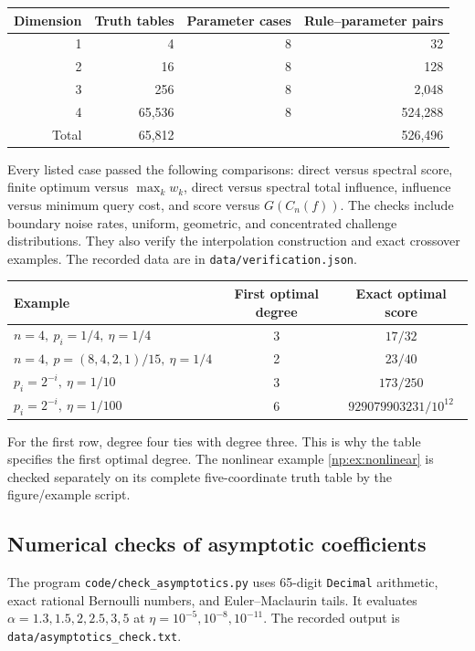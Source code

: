 \documentclass[11pt,a4paper]{article}
\theoremstyle{definition}
\theoremstyle{remark}
\begin{document}
\begin{center}
\begin{tabular}{@{}rrrr@{}}
\toprule
Dimension&Truth tables&Parameter cases&Rule--parameter pairs\\
\midrule
1&4&8&32\\
2&16&8&128\\
3&256&8&2,048\\
4&65,536&8&524,288\\
\midrule
Total&65,812&&526,496\\
\bottomrule
\end{tabular}
\end{center}

Every listed case passed the following comparisons: direct versus spectral
score, finite optimum versus \(\max_k w_k\), direct versus spectral total
influence, influence versus minimum query cost, and score versus
\(G(C_n(f))\). The checks include boundary noise rates, uniform,
geometric, and concentrated challenge distributions. They also verify
the interpolation construction and exact crossover examples.
The recorded data are in \texttt{data/verification.json}.

\begin{center}
\small
\begin{tabular}{@{}L{.39\textwidth}cc@{}}
\toprule
Example & First optimal degree & Exact optimal score\\
\midrule
\(n=4,\ p_i=1/4,\ \eta=1/4\)&3&\(17/32\)\\
\(n=4,\ p=(8,4,2,1)/15,\ \eta=1/4\)&2&\(23/40\)\\
\(p_i=2^{-i},\ \eta=1/10\)&3&\(173/250\)\\
\(p_i=2^{-i},\ \eta=1/100\)&6&\(929079903231/10^{12}\)\\
\bottomrule
\end{tabular}
\end{center}

For the first row, degree four ties with degree three. This is why
the table specifies the first optimal degree. The nonlinear example
\ref{np:ex:nonlinear} is checked separately on its complete
five-coordinate truth table by the figure/example script.

\subsection{Numerical checks of asymptotic coefficients}

The program \texttt{code/check\_asymptotics.py} uses 65-digit
\texttt{Decimal} arithmetic, exact rational Bernoulli numbers, and
Euler--Maclaurin tails. It evaluates
\(\alpha=1.3,1.5,2,2.5,3,5\) at
\(\eta=10^{-5},10^{-8},10^{-11}\). The recorded output is
\texttt{data/asymptotics\_check.txt}.
\end{document}
